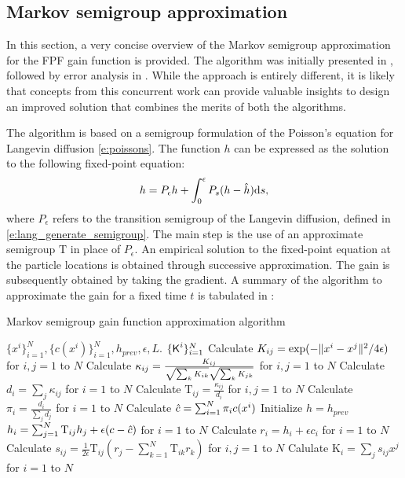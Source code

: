 \subsection{Markov semigroup approximation}
\label{s:coifman}
In this section, a very concise overview of the Markov semigroup approximation for the FPF gain function is provided. The algorithm was initially presented in \cite{tagmeh16}, followed by error analysis in \cite{tagmehmey17}. While the approach is entirely different, it is likely that concepts from this concurrent work can provide valuable insights to design an improved solution that combines the merits of both the algorithms. 

The algorithm is based on a semigroup formulation of the Poisson's equation for Langevin diffusion \eqref{e:poissons}. The function $h$ can be expressed as the solution to the following fixed-point equation:
\begin{equation}
h = P_\epsilon h + \int_0^\epsilon P_s (h - {\hat h}) \text{d} s,
\end{equation}
where $P_\epsilon$ refers to the transition semigroup of the Langevin diffusion, defined in \eqref{e:lang_generate_semigroup}. The main step is the use of an approximate semigroup $\text{T}$ in place of $P_\epsilon$.
An empirical solution to the fixed-point equation at the particle locations is obtained through successive approximation. The gain is subsequently obtained by taking the gradient.  A summary of the algorithm to approximate the gain for a fixed time $t$ is tabulated in :
\begin{algorithm}{Markov semigroup gain function approximation algorithm}
\begin{algorithmic}[1]
	\Require $\{x^i\}_{i=1}^N, \{c(x^i)\}_{i=1}^N, h_{prev}, \epsilon, L$.
	\Ensure $\{\text{\sf K}^i\}_{i=1}^N$
	\State Calculate $K_{ij} = \exp(-\|x^i - x^j\|^2/ 4\epsilon)$ for $i,j = 1$ to $N$  
	\State Calculate $\kappa_{ij} = \frac{K_{ij}}{\sqrt{\sum_k K_{ik}}\sqrt{\sum_k K_{jk}}}$ for $i,j =1$ to $N$
	\State Calculate $d_i = \sum_j \kappa_{ij}$ for $i=1$ to $N$
	\State Calculate $\text{T}_{ij} = \frac{\kappa_{ij}}{d_i}$ for $i,j = 1$ to $N$ 
	\State Calculate $\pi_i = \frac{d_i}{\sum_j d_j}$ for $i=1$ to $N$
	\State Calculate $ {\hat c} = \sum_{i = 1}^N \pi_i c(x^i)$
	\State Initialize $h =h_{prev}$
		 \State $h_i = \sum_{j=1}^N \text{T}_{ij} h_j + \epsilon (c - {\hat c})$ for $i=1$ to $N$ 
		\EndFor
	\State Calculate $r_i = h_i + \epsilon c_i$ for $i=1$ to $N$
	\State Calculate $s_{ij} = \frac{1}{2\epsilon} \text{T}_{ij} (r_j - \sum_{k=1}^N \text{T}_{ik} r_k)$ for $i,j=1$ to $N$ 
	\State Calulate $\text{K}_i  = \sum_j s_{ij} x^j$ for $i =1$ to $N$ 
	\label{alg:coifman}
\end{algorithmic}
\end{algorithm}

